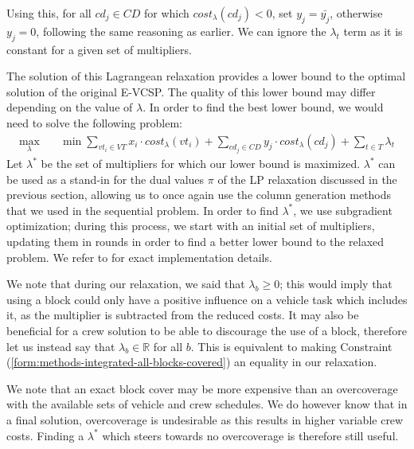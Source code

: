 \documentclass[]{article}
\begin{document}
Using this, for all $cd_j \in CD$ for which $cost_\lambda(cd_j) < 0$, set $y_j = \bar{y_{j}}$, otherwise $y_j = 0$, following the same reasoning as earlier. We can ignore the $\lambda_t$ term as it is constant for a given set of multipliers.

The solution of this Lagrangean relaxation provides a lower bound to the optimal solution of the original E-VCSP. The quality of this lower bound may differ depending on the value of $\lambda$. In order to find the best lower bound, we would need to solve the following problem:
\begin{align}
\max_{\lambda} \quad & \min \sum_{vt_i \in VT} x_{i} \cdot cost_\lambda(vt_i) + \sum_{cd_j \in CD} y_{j} \cdot cost_\lambda(cd_j) + \sum_{t \in T} \lambda_{t}
\end{align}
Let $\lambda^*$ be the set of multipliers for which our lower bound is maximized. $\lambda^*$ can be used as a stand-in for the dual values $\pi$ of the LP relaxation discussed in the previous section, allowing us to once again use the column generation methods that we used in the sequential problem. In order to find $\lambda^*$, we use subgradient optimization; during this process, we start with an initial set of multipliers, updating them in rounds in order to find a better lower bound to the relaxed problem. We refer to \citet{Beasley1993} for exact implementation details. 

We note that during our relaxation, we said that $\lambda_b \geq 0$; this would imply that using a block could only have a positive influence on a vehicle task which includes it, as the multiplier is subtracted from the reduced costs. It may also be beneficial for a crew solution to be able to discourage the use of a block, therefore let us instead say that $\lambda_b \in \mathbb{R}$ for all $b$. This is equivalent to making Constraint (\ref{form:methods-integrated-all-blocks-covered}) an equality in our relaxation. 

We note that an exact block cover may be more expensive than an overcoverage with the available sets of vehicle and crew schedules. We do however know that in a final solution, overcoverage is undesirable as this results in higher variable crew costs. Finding a $\lambda^*$ which steers towards no overcoverage is therefore still useful.
\end{document}

